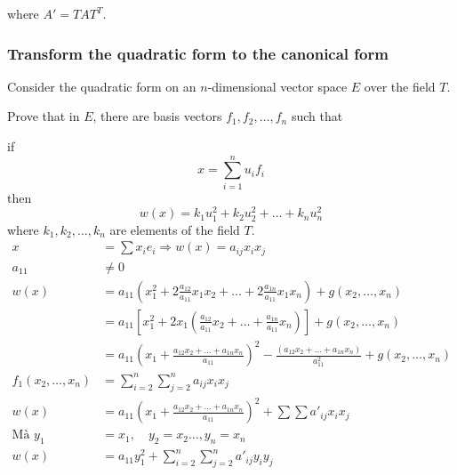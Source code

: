 where $A' = T A T^T$.

\subsubsection{Transform the quadratic form to the canonical form}
Consider the quadratic form on an $n$-dimensional vector space $E$ over the field $T$.

Prove that in $E$, there are basis vectors $f_1, f_2, \ldots, f_n$ such that

if
\begin{equation*}
    x = \sum_{i=1}^n u_i f_i
\end{equation*}
then
\[
w(x) = k_1 u_1^2 + k_2 u_2^2 + \ldots + k_n u_n^2
\]
where $k_1, k_2, \ldots, k_n$ are elements of the field $T$.
\begin{align*}
    x &= \sum x_i e_i \Rightarrow w(x) = a_{ij}x_ix_j\\
    a_{11} &\neq 0 \\
    w(x) &= a_{11}\left(x_1^2 + 2\frac{a_{12}}{a_{11}}x_1x_2 + \ldots + 2\frac{a_{1n}}{a_{11}}x_1x_n \right) + g(x_2, \ldots, x_n)\\
    &= a_{11}\left[x_1^2 + 2x_1\left(\frac{a_{12}}{a_{11}}x_2 + \ldots + \frac{a_{1n}}{a_{11}}x_n\right)\right] + g(x_2, \ldots, x_n)\\
    &= a_{11}\left(x_1 + \frac{a_{12}x_2 + \ldots + a_{1n}x_n}{a_{11}}\right)^2 - \frac{(a_{12}x_2 + \ldots + a_{1n}x_n)}{a_{11}^2}+ g(x_2, \ldots, x_n)\\
    f_1(x_2, \ldots, x_n) &= \sum_{i=2}^n \sum_{j=2}^n a_{ij}x_ix_j\\
    w(x) &= a_{11}\left(x_1 + \frac{a_{12}x_2 + \ldots + a_{1n}x_n}{a_{11}}\right)^2 + \sum\sum a'_{ij}x_ix_j\\
    \textrm{Mà }y_1 &= x_1, \quad y_2 = x_2  \ldots, y_n = x_n\\
    w(x) &= a_{11}y_1^2 + \sum^n_{i=2} \sum^n_{j=2} a'_{ij}y_iy_j
\end{align*}


